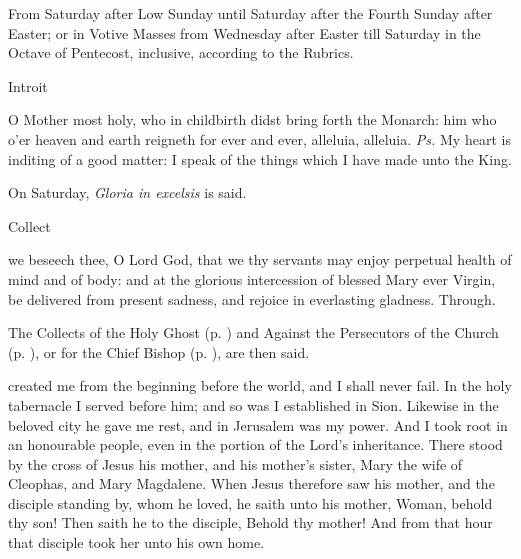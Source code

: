 \begin{rubric}
    {From Saturday after Low Sunday until Saturday after the Fourth Sunday after Easter; or in Votive Masses from Wednesday after Easter till Saturday in the Octave of Pentecost, inclusive, according to the Rubrics.}
\end{rubric}
\begin{inhead}
    Introit
\end{inhead}
 O Mother most holy, who in childbirth didst bring forth the Monarch: him who o'er heaven and earth reigneth for ever and ever, alleluia, alleluia. \textit{Ps.} My heart is inditing of a good matter: I speak of the things which I have made unto the King.
\begin{rubric}
    On Saturday, \emph{Gloria in excelsis} is said.
\end{rubric}
\begin{inhead}
    Collect
\end{inhead}
 we beseech thee, O Lord God, that we thy servants may enjoy perpetual health of mind and of body: and at the glorious intercession of blessed Mary ever Virgin, be delivered from present sadness, and rejoice in everlasting gladness. Through.
\begin{rubric}
    The Collects of the Holy Ghost (p. \pageref{SPHolyGhost}) and Against the Persecutors of the Church (p. \pageref{SPAgainst}), or for the Chief Bishop (p. \pageref{SPChiefBishop}), are then said.
\end{rubric}
 created me from the beginning before the world, and I shall never fail. In the holy tabernacle I served before him; and so was I established in Sion. Likewise in the beloved city he gave me rest, and in Jerusalem was my power. And I took root in an honourable people, even in the portion of the Lord's inheritance.
 There stood by the cross of Jesus his mother, and his mother's sister, Mary the wife of Cleophas, and Mary Magdalene. When Jesus therefore saw his mother, and the disciple standing by, whom he loved, he saith unto his mother, Woman, behold thy son! Then saith he to the disciple, Behold thy mother! And from that hour that disciple took her unto his own home.
